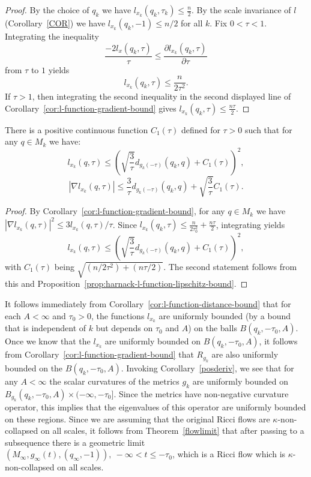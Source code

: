 \begin{proof}
 By the choice of $q_k$ we have $l_{x_k}(q_k,\tau_k)\le \frac{n}{2}$.
 By the scale invariance of $l$ (Corollary~\ref{COR}) we have
 $l_{x_k}(q_k,-1)\le n/2$ for all $k$. Fix $0<\tau<1$. Integrating the inequality
$$\frac{-2l_x(q_k,\tau)}{\tau}\le \frac{\partial l_{x_k}(q_k,\tau)}{\partial \tau}$$
 from $\tau$ to $1$  yields
$$l_{x_k}(q_k,\tau)\le \frac{n}{2\tau^2}.$$
If $\tau>1$, then
 integrating the second inequality in the second displayed line of Corollary~\ref{cor:l-function-gradient-bound} gives
 $l_{x_k}(q_k,\tau)\le \frac{n\tau}{2}$.
\end{proof}

\begin{corollary}\label{cor:l-function-distance-bound}
\label{lxkest}
There is a  positive continuous function $C_1(\tau)$ defined for
$\tau>0$ such that for any $q\in M_k$ we have:
$$l_{x_k}(q,\tau)\le
\left(\sqrt{\frac{3}{\tau}}d_{g_k(-\tau)}(q_k,q)+C_1(\tau)\right)^2,$$
$$|\nabla l_{x_k}(q,\tau)|\le
\frac{3}{\tau}d_{g_k(-\tau)}(q_k,q)+\sqrt{\frac{3}{\tau}}C_1(\tau).$$
\end{corollary}

\begin{proof}
 By Corollary~\ref{cor:l-function-gradient-bound}, for any $q\in M_k$ we have $|\nabla
l_{x_k}(q,\tau)|^2\le 3l_{x_k}(q,\tau)/\tau$. Since
$l_{x_k}(q_k,\tau)\le \frac {n}{2\tau_0^2}+\frac{n\tau}{2}$,
integrating yields
$$l_{x_k}(q,\tau)\le
\left(\sqrt{\frac{3}{\tau}}d_{g_k(-\tau)}(q_k,q)+C_1(\tau)\right)^2,$$
with $C_1(\tau)$ being $\sqrt{(n/2\tau^2)+(n\tau/2)}$. The second
statement follows from this and Proposition~\ref{prop:harnack-l-function-lipschitz-bound}.
\end{proof}

It follows immediately from Corollary~\ref{cor:l-function-distance-bound} that for each
$A<\infty$ and $\tau_0>0$, the functions $l_{x_k}$ are uniformly
bounded (by a bound that is independent of $k$ but depends on
$\tau_0$ and $A$) on the balls $B(q_k,-\tau_0,A)$. Once we know that
the $l_{x_k}$ are uniformly bounded on $B(q_k,-\tau_0,A)$, it
follows from Corollary~\ref{cor:l-function-gradient-bound} that $R_{g_k}$ are also
uniformly bounded on the $B(q_k,-\tau_0,A)$. Invoking
Corollary~\ref{posderiv},
 we see
that for any $A<\infty$ the scalar curvatures of the metrics $g_k$
are uniformly bounded on $B_{g_k}(q_k,-\tau_0,A)\times (-\infty,
-\tau_0]$. Since the metrics have non-negative curvature operator,
this implies that the eigenvalues of this operator are  uniformly
bounded on these regions.
 Since we are assuming
that the original Ricci flows are $\kappa$-non-collapsed on all
scales, it follows from Theorem~\ref{flowlimit} that after passing
to a subsequence there is a geometric limit
$(M_\infty,g_\infty(t),(q_\infty,-1)),\ -\infty<t\le -\tau_0$, which
is a Ricci flow which is $\kappa$-non-collapsed on all scales.

